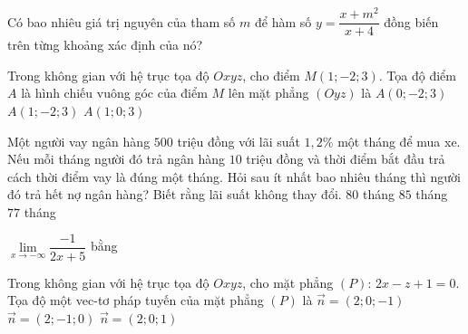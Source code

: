 \begin{ex}%
Có bao nhiêu giá trị nguyên của tham số $m$ để hàm số $y=\dfrac{x+m^2}{x+4}$ đồng biến trên từng khoảng xác định của nó?
\end{ex}

\begin{ex}%
Trong không gian với hệ trục tọa độ $Oxyz$, cho điểm $M(1;-2;3)$. Tọa độ điểm $A$ là hình chiếu vuông góc của điểm $M$ lên mặt phẳng $(Oyz)$ là
{\True $A(0;-2;3)$}
{$A(1;-2;3)$}
{$A(1;0;3)$}
\end{ex}
\begin{ex}%
Một người vay ngân hàng $500$ triệu đồng với lãi suất $1,2 \%$ một tháng để mua xe. Nếu mỗi tháng người đó trả ngân hàng $10$ triệu đồng và thời điểm bắt đầu trả cách thời điểm vay là đúng một tháng. Hỏi sau ít nhất bao nhiêu tháng thì người đó trả hết nợ ngân hàng? Biết rằng lãi suất không thay đổi.
{$80$ tháng}
{$85$ tháng}
{\True $77$ tháng}
\end{ex}
\begin{ex}%
$\lim\limits_{x\to -\infty}\dfrac{-1}{2x+5}$ bằng
\end{ex}

\begin{ex}%
Trong không gian với hệ trục tọa độ $Oxyz$, cho mặt phẳng $(P)$: $2x-z+1=0$. Tọa độ một vec-tơ pháp tuyến của mặt phẳng $(P)$ là
{\True $\vec{n}=(2;0;-1)$}
{$\vec{n}=(2;-1;0)$}
{$\vec{n}=(2;0;1)$}
\end{ex}

